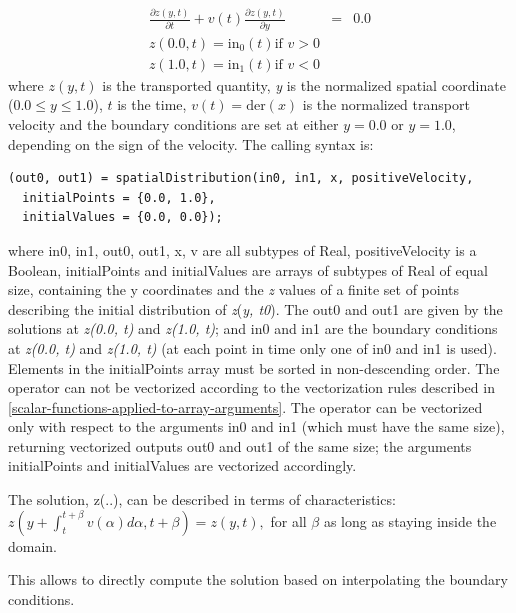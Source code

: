 \documentclass[10pt,a4paper]{report}
\begin{document}
\begin{eqnarray*}
\frac{\partial z(y,t)}{\partial t}+v(t)\frac{\partial z(y,t)}{\partial y}&=&0.0\\
z(0.0, t)=\mathrm{in}_0(t) \text{if $v>0$}\\
z(1.0, t)=\mathrm{in}_1(t) \text{if $v<0$}
\end{eqnarray*}
where $z(y, t)$ is the transported quantity, \emph{y} is the
normalized spatial coordinate ($0.0 \le y \le 1.0$), $t$ is the
time, $v(t)=\mathrm{der}(x)$ is the normalized
transport velocity and the boundary conditions are set at either
$y=0.0$ or $y=1.0$, depending on the sign of the velocity.
The calling syntax is:
\begin{lstlisting}[language=modelica]
(out0, out1) = spatialDistribution(in0, in1, x, positiveVelocity,
  initialPoints = {0.0, 1.0},
  initialValues = {0.0, 0.0});
\end{lstlisting}
where in0, in1, out0, out1, x, v are all subtypes of Real,
positiveVelocity is a Boolean, initialPoints and initialValues are
arrays of subtypes of Real of equal size, containing the y coordinates
and the \emph{z} values of a finite set of points describing the initial
distribution of \emph{z}(\emph{y, t0}). The out0 and out1 are given by
the solutions at \emph{z(0.0, t)} and \emph{z(1.0, t)}; and in0 and in1
are the boundary conditions at \emph{z(0.0, t)} and \emph{z(1.0, t)} (at
each point in time only one of in0 and in1 is used). Elements in the
initialPoints array must be sorted in non-descending order. The operator
can not be vectorized according to the vectorization rules described in
\ref{scalar-functions-applied-to-array-arguments}. The operator can be vectorized only with respect to the
arguments in0 and in1 (which must have the same size), returning
vectorized outputs out0 and out1 of the same size; the arguments
initialPoints and initialValues are vectorized accordingly.

The solution, z(..), can be described in terms of characteristics:
$z(y+\int_t^{t+\beta}v(\alpha)d\alpha,t+\beta)=z(y,t),$ for all $\beta$ as long as staying inside the domain.

This allows to directly compute the solution based on interpolating the
boundary conditions.
\end{document}
